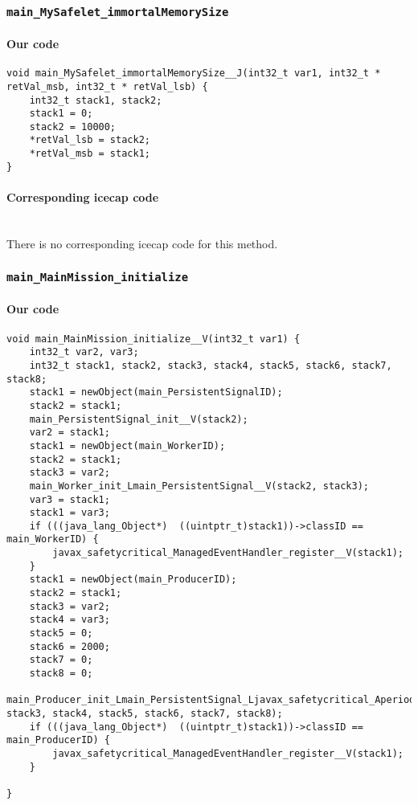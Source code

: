 \subsubsection{\texttt{main\_MySafelet\_immortalMemorySize}}

\paragraph{Our code}\hfill
\begin{lstlisting}[firstnumber=2301]
void main_MySafelet_immortalMemorySize__J(int32_t var1, int32_t * retVal_msb, int32_t * retVal_lsb) {
	int32_t stack1, stack2;
	stack1 = 0;
	stack2 = 10000;
	*retVal_lsb = stack2;
	*retVal_msb = stack1;
}
\end{lstlisting}

\paragraph{Corresponding icecap code}\hfill\\
There is no corresponding icecap code for this method.

\subsubsection{\texttt{main\_MainMission\_initialize}}

\paragraph{Our code}\hfill
\begin{lstlisting}[firstnumber=2329]
void main_MainMission_initialize__V(int32_t var1) {
	int32_t var2, var3;
	int32_t stack1, stack2, stack3, stack4, stack5, stack6, stack7, stack8;
	stack1 = newObject(main_PersistentSignalID);
	stack2 = stack1;
	main_PersistentSignal_init__V(stack2);
	var2 = stack1;
	stack1 = newObject(main_WorkerID);
	stack2 = stack1;
	stack3 = var2;
	main_Worker_init_Lmain_PersistentSignal__V(stack2, stack3);
	var3 = stack1;
	stack1 = var3;
	if (((java_lang_Object*)  ((uintptr_t)stack1))->classID == main_WorkerID) {
		javax_safetycritical_ManagedEventHandler_register__V(stack1);
	}
	stack1 = newObject(main_ProducerID);
	stack2 = stack1;
	stack3 = var2;
	stack4 = var3;
	stack5 = 0;
	stack6 = 2000;
	stack7 = 0;
	stack8 = 0;
	main_Producer_init_Lmain_PersistentSignal_Ljavax_safetycritical_AperiodicEventHandler_JJ_V(stack2, stack3, stack4, stack5, stack6, stack7, stack8);
	if (((java_lang_Object*)  ((uintptr_t)stack1))->classID == main_ProducerID) {
		javax_safetycritical_ManagedEventHandler_register__V(stack1);
	}

}
\end{lstlisting}

